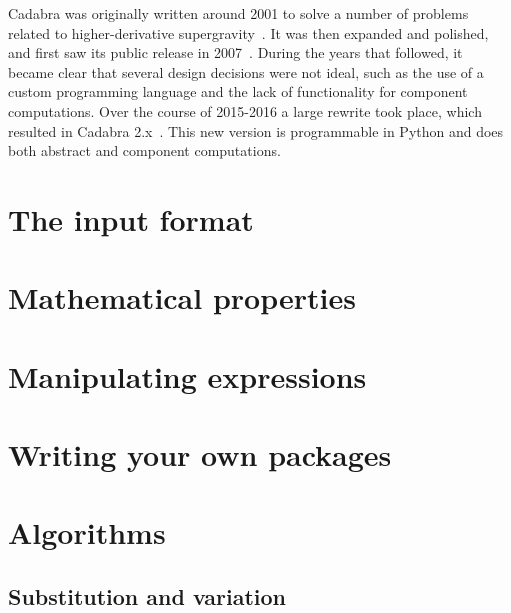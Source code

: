 \documentclass[11pt]{book}
\begin{document}
Cadabra was originally written around 2001 to solve a number of
problems related to higher-derivative
supergravity~\cite{Peeters:2000qj,Peeters:2003pv}. It was then
expanded and polished, and first saw its public release in
2007~\cite{kas_cdb_hep}.  During the years that followed, it became
clear that several design decisions were not ideal, such as the use of
a custom programming language and the lack of functionality for
component computations. Over the course of 2015-2016 a large rewrite
took place, which resulted in Cadabra 2.x~\cite{Peeters:2018dyg}.
This new version is programmable in Python and does both abstract and
component computations.


\chapter{The input format}






\chapter{Mathematical properties}


\chapter{Manipulating expressions}





\chapter{Writing your own packages}



\chapter{Algorithms}

\section{Substitution and variation}
\end{document}
